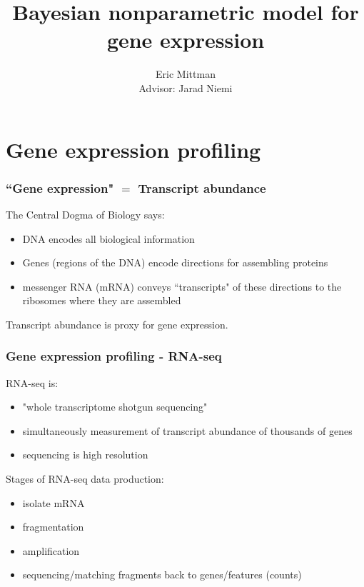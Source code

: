 \documentclass{beamer}
\title{Bayesian nonparametric model for gene expression}
\author{Eric Mittman \\ \vspace{.5cm} Advisor: Jarad Niemi}
\begin{document}
\frame{\titlepage}


\section[Gene Expr.]{Gene expression profiling}

\begin{frame}%
\frametitle{``Gene expression" $=$ Transcript abundance}
{\scriptsize \citep[\textit{Statistical Analysis of Next Generation Sequencing Data}]{datta2014}}
The Central Dogma of Biology says:
\begin{itemize}
\pause\item DNA encodes all biological information
\pause\item Genes (regions of the DNA) encode directions for assembling proteins
\pause\item messenger RNA (mRNA) conveys ``transcripts" of these directions to the ribosomes where they are assembled 
\end{itemize}
\pause Transcript abundance is proxy for gene expression.
\end{frame}

\begin{frame}%
\frametitle{Gene expression profiling - RNA-seq}
\pause RNA-seq is:
\vspace{.5cm}
\begin{itemize}
\pause \item "whole transcriptome shotgun sequencing"
\pause \item simultaneously measurement of transcript abundance of thousands of genes
\pause \item sequencing is high resolution
\end{itemize}

\vspace{.5cm}
Stages of RNA-seq data production:
\vspace{.5cm}
\begin{itemize}
\pause \item isolate mRNA
\pause \item fragmentation
\pause \item amplification
\pause \item sequencing/matching fragments back to genes/features (counts)
\end{itemize}
\end{frame}
\end{document}
